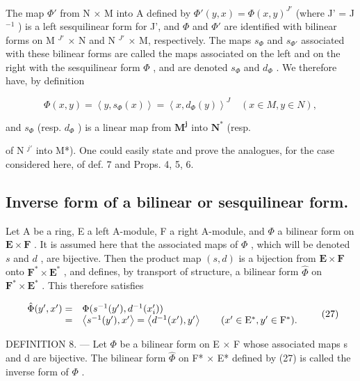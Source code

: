 The map \(\Phi'\) from N × M into A defined by \(\Phi'(y, x) = \Phi(x, y)^{J'}\) (where J' = J \(^{-1}\) ) is a left sesquilinear form for J', and \(\Phi\) and \(\Phi'\) are identified with bilinear forms on M \(^{J'}\) × N and N \(^{J'}\) × M, respectively. The maps \(s_{\Phi}\) and \(s_{\Phi'}\) associated with these bilinear forms are called the maps associated on the left and on the right with the sesquilinear form \(\Phi\) , and are denoted \(s_{\Phi}\) and \(d_{\Phi}\) . We therefore have, by definition

\[
\Phi (x, y) = \left\langle y, s _ {\Phi} (x) \right\rangle = \left\langle x, d _ {\Phi} (y) \right\rangle^ {J} \quad (x \in M, y \in N),\tag{26}
\]

and \(s_{\Phi}\) (resp. \(d_{\Phi}\) ) is a linear map from \(\mathbf{M}^{\mathbf{j}}\) into \(\mathbf{N}^{*}\) (resp.

of N \(^{j'}\) into M*). One could easily state and prove the analogues, for the case considered here, of def. 7 and Props. 4, 5, 6.

\subsection{Inverse form of a bilinear or sesquilinear form.}

Let A be a ring, E a left A-module, F a right A-module, and \(\Phi\) a bilinear form on \(\mathbf{E} \times \mathbf{F}\) . It is assumed here that the associated maps of \(\Phi\) , which will be denoted \(s\) and \(d\) , are bijective. Then the product map \((s, d)\) is a bijection from \(\mathbf{E} \times \mathbf{F}\) onto \(\mathbf{F}^* \times \mathbf{E}^*\) , and defines, by transport of structure, a bilinear form \(\hat{\Phi}\) on \(\mathbf{F}^* \times \mathbf{E}^*\) . This therefore satisfies

\[
\begin{array}{r l} \hat {\Phi} (y ^ {\prime}, x ^ {\prime}) = & \Phi (s ^ {- 1} (y ^ {\prime}), d ^ {- 1} (x _ {i} ^ {\prime})) \\ = & \left\langle s ^ {- 1} (y ^ {\prime}), x ^ {\prime} \right\rangle = \left\langle d ^ {- 1} (x ^ {\prime}), y ^ {\prime} \right\rangle \qquad (x ^ {\prime} \in \mathrm{E} ^ {*}, y ^ {\prime} \in \mathrm{F} ^ {*}). \end{array}\tag{27}
\]

DEFINITION 8. --- Let \(\Phi\) be a bilinear form on E × F whose associated maps s and d are bijective. The bilinear form \(\hat{\Phi}\) on F* × E* defined by (27) is called the inverse form of \(\Phi\) .

